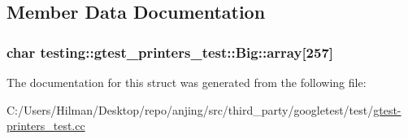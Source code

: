 \subsection{Member Data Documentation}
\hypertarget{structtesting_1_1gtest__printers__test_1_1_big_a863911a8ec5c3bbe79c44d399f1de61f}{}
\subsubsection[{array}]{\setlength{\rightskip}{0pt plus 5cm}char testing\+::gtest\+\_\+printers\+\_\+test\+::\+Big\+::array\mbox{[}257\mbox{]}}\label{structtesting_1_1gtest__printers__test_1_1_big_a863911a8ec5c3bbe79c44d399f1de61f}


The documentation for this struct was generated from the following file\+:\begin{DoxyCompactItemize}
\item 
C\+:/\+Users/\+Hilman/\+Desktop/repo/anjing/src/third\+\_\+party/googletest/test/\hyperlink{gtest-printers__test_8cc}{gtest-\/printers\+\_\+test.\+cc}\end{DoxyCompactItemize}
